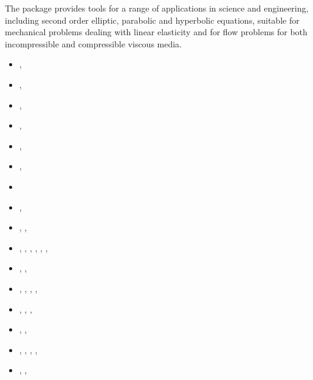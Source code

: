 \begin{itemize}
The package provides tools for a range of applications in science and engineering, including 
second order elliptic, parabolic and hyperbolic equations, suitable for mechanical 
problems dealing with linear elasticity and for flow problems for both incompressible
and compressible viscous media.

\begin{scriptsize}
\begin{itemize}
\item[\nineteenninetythree]  \textcite{beky93},  \textcite{vavy93}
\item[\nineteenninetyfour]   \textcite{vlvv94},  \textcite{vayv94}
\item[\nineteenninetyfive]   \textcite{vayv95},  \textcite{vayu95}
\item[\nineteenninetysix]    \textcite{vayu96},  \textcite{vaky96}
\item[\nineteenninetyseven]  \textcite{vayu97},  \textcite{vank97}
\item[\nineteenninetyeight]  \textcite{devv98},  \textcite{vaba98}
\item[\nineteenninetynine]   \textcite{devv99}
\item[\twothousand]          \textcite{devv00b}, \textcite{vavv00}
\item[\twothousandone]       \textcite{drvc01},  \textcite{vavv01},  \textcite{scvy01}
\item[\twothousandtwo]       \textcite{mcvk02},  \textcite{civv02},
                             \textcite{vavv02},  \textcite{vavv02b}, \textcite{vakp02},
                             \textcite{vaya02},  \textcite{scvy02} 
\item[\twothousandthree]     \textcite{mcvk03},  \textcite{vavd03},  \textcite{vabh03}
\item[\twothousandfour]      \textcite{vavv04},  \textcite{vavv04b}, \textcite{vavv04c}, 
                             \textcite{vayr04},  \textcite{vavv04d}
\item[\twothousandfive]      \textcite{vavv05},  \textcite{sepr05}, 
                             \textcite{vary05},  \textcite{liva05}
\item[\twothousandsix]       \textcite{liva06a}, \textcite{liva06b}, \textcite{abvk06}
\item[\twothousandseven]     \textcite{vant07},  \textcite{civv07},  \textcite{brva07a},
                             \textcite{brva07b}, \textcite{knvk07}
\item[\twothousandeight]     \textcite{plva08},  \textcite{brhv08},  

\end{itemize}
\end{scriptsize}
\end{itemize}
